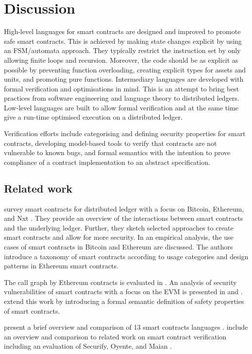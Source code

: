 \section{Discussion}
\label{discuss}

High-level languages for smart contracts are designed and improved to promote safe smart contracts.
This is achieved by making state changes explicit by using an FSM/automata approach. 
They typically restrict the instruction set by only allowing finite loops and recursion.
Moreover, the code should be as explicit as possible by preventing function overloading, creating explicit types for assets and units, and promoting pure functions.
Intermediary languages are developed with formal verification and optimisations in mind.
This is an attempt to bring best practices from software engineering and language theory to distributed ledgers.
Low-level languages are built to allow formal verification and at the same time give a run-time optimised execution on a distributed ledger.

Verification efforts include categorising and defining security properties for smart contracts, developing model-based tools to verify that contracts are not vulnerable to known bugs, and formal semantics with the intention to prove compliance of a contract implementation to an abstract specification.

\subsection{Related work}
\citeauthor{Seijas2017} survey smart contracts for distributed ledger with a focus on Bitcoin, Ethereum, and Nxt \cite{Seijas2017}.
They provide an overview of the interactions between smart contracts and the underlying ledger.
Further, they sketch selected approaches to create smart contracts and allow for more security.
In an empirical analysis, the use cases of smart contracts in Bitcoin and Ethereum are discussed\cite{Bartoletti2017}.
The authors introduce a taxonomy of smart contracts according to usage categories and design patterns in Ethereum smart contracts.

The call graph by Ethereum contracts is evaluated in \cite{Frowis2017}.
An analysis of security vulnerabilities of smart contracts with a focus on the EVM is presented in \cite{Luu2016} and \cite{Atzei2017}.
\citeauthor{Grishchenko2018} extend this work by introducing a formal semantic definition of safety properties of smart contracts.

\citeauthor{Sergey2018} present a brief overview and comparison of 13 smart contracts languages \cite{Sergey2018}. \citeauthor{Tsankov2017} include an overview and comparison to related work on smart contract verification including an evaluation of Securify, Oyente, and Maian \cite{Tsankov2017}.


